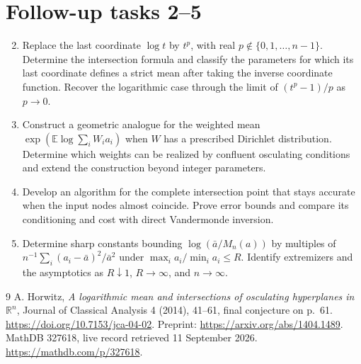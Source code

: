 \documentclass[11pt]{article}
\begin{document}
\section{Follow-up tasks 2--5}
\begin{enumerate}
\setcounter{enumi}{1}
\renewcommand{\labelenumi}{\textbf{Task \arabic{enumi}.}}
\item Replace the last coordinate $\log t$ by $t^p$, with real
$p\notin\{0,1,\ldots,n-1\}$. Determine the intersection formula and
classify the parameters for which its last coordinate defines a strict
mean after taking the inverse coordinate function. Recover the logarithmic
case through the limit of $(t^p-1)/p$ as $p\to0$.
\item Construct a geometric analogue for the weighted mean
$\exp(\mathbb E\log\sum_iW_i a_i)$ when $W$ has a prescribed Dirichlet
distribution. Determine which weights can be realized by confluent
osculating conditions and extend the construction beyond integer parameters.
\item Develop an algorithm for the complete intersection point that stays
accurate when the input nodes almost coincide. Prove error bounds and
compare its conditioning and cost with direct Vandermonde inversion.
\item Determine sharp constants bounding
$\log(\bar a/M_n(a))$ by multiples of
$n^{-1}\sum_i(a_i-\bar a)^2/\bar a^2$ under
$\max_i a_i/\min_i a_i\leq R$. Identify extremizers and the asymptotics
as $R\downarrow1$, $R\to\infty$, and $n\to\infty$.
\end{enumerate}

\begin{thebibliography}{9}
 A. Horwitz, \emph{A logarithmic mean and intersections of
osculating hyperplanes in $\mathbb R^n$}, Journal of Classical Analysis 4
(2014), 41--61, final conjecture on p.~61.
\url{https://doi.org/10.7153/jca-04-02}.
Preprint: \url{https://arxiv.org/abs/1404.1489}.
 MathDB 327618, live record retrieved 11 September 2026.
\url{https://mathdb.com/p/327618}.
\end{thebibliography}
\end{document}
